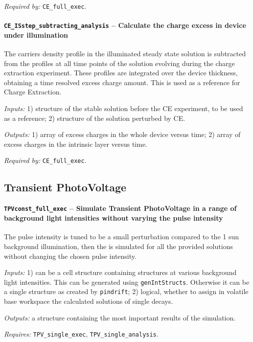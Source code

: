 		\textit{Required by:} \texttt{CE\_full\_exec}.

		\paragraph{\texttt{CE\_ISstep\_subtracting\_analysis} -- Calculate the charge excess in device under illumination}
		The carriers density profile in the illuminated steady state solution is subtracted from the profiles
		at all time points of the solution evolving during the charge extraction experiment.
		These profiles are integrated over the device thickness, obtaining a time resolved excess charge amount.
		This is used as a reference for Charge Extraction.

		\textit{Inputs:} 1) structure of the stable solution before the CE experiment, to be used as a reference;
		2) structure of the solution perturbed by CE.

		\textit{Outputs:} 1) array of excess charges in the whole device versus time;
		2) array of excess charges in the intrinsic layer versus time.

		\textit{Required by:} \texttt{CE\_full\_exec}.


	\subsection{Transient PhotoVoltage}\label{dd_tpv}

		\paragraph{\texttt{TPV\-const\_full\_exec} -- Simulate Transient PhotoVoltage in a range of background light intensities without varying the pulse intensity}
		The pulse intensity is tuned to be a small perturbation compared to the 1
		sun background illumination, then the  is simulated for all the
		provided solutions without changing the chosen pulse intensity.

		\textit{Inputs:} 1) can be a cell structure containing structures at various background
		light intensities. This can be generated using \texttt{gen\-Int\-Structs}.
		Otherwise it can be a single structure as created by \texttt{pin\-drift};
		2) logical, whether to assign in volatile base
		workspace the calculated solutions of single  decays.

		\textit{Outputs:} a structure containing the most important results of the simulation.

		\textit{Requires:} \texttt{TPV\_single\_exec}, \texttt{TPV\_single\_analysis}.


